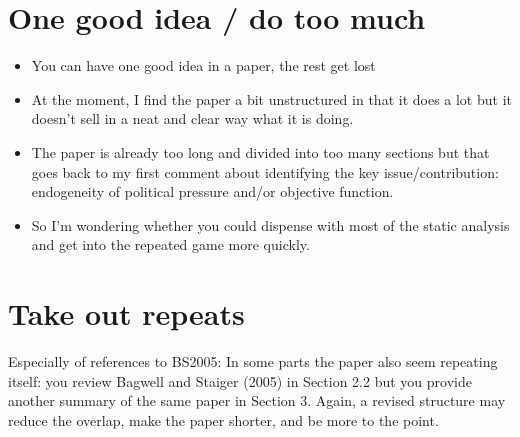 \documentclass[12pt]{article}
\begin{document}
\section{One good idea / do too much}
		\begin{itemize}
			\item You can have one good idea in a paper, the rest get lost
			\item At the moment, I find the paper a bit unstructured in that it does a lot but it doesn't sell in a neat and clear way what it is doing.
			\item The paper is already too long and divided into too many sections but that goes back to my first comment about identifying the key issue/contribution: endogeneity of political pressure and/or objective function.
			\item So I'm wondering whether you could dispense with most of the static analysis and get into the repeated game more quickly.
		\end{itemize}


\section{Take out repeats}
	Especially of references to BS2005: In some parts the paper also seem repeating itself: you review Bagwell and Staiger (2005) in Section 2.2 but you provide another summary of the same paper in Section 3. Again, a revised structure may reduce the overlap, make the paper shorter, and be more to the point.
	
\end{document}
